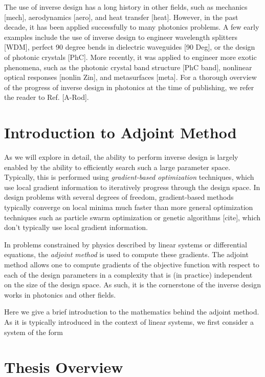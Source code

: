 The use of inverse design has a long history in other fields, such as mechanics [mech], aerodynamics [aero], and heat transfer [heat].
However, in the past decade, it has been applied successfully to many photonics problems.
A few early examples include the use of inverse design to engineer wavelength splitters [WDM], perfect 90 degree bends in dielectric waveguides [90 Deg], or the design of photonic crystals [PhC].
More recently, it was applied to engineer more exotic phenomena, such as the photonic crystal band structure [PhC band], nonlinear optical responses [nonlin Zin], and metasurfaces [meta].
For a thorough overview of the progress of inverse design in photonics at the time of publishing, we refer the reader to Ref. [A-Rod].

\section{Introduction to Adjoint Method}

As we will explore in detail, the ability to perform inverse design is largely enabled by the ability to efficiently search such a large parameter space.
Typically, this is performed using \textit{gradient-based optimization} techniques, which use local gradient information to iteratively progress through the design space.
In design problems with several degrees of freedom, gradient-based methods typically converge on local minima much faster than more general optimization techniques such as particle swarm optimization or genetic algorithms [cite], which don't typically use local gradient information.

In problems constrained by physics described by linear systems or differential equations, the \textit{adjoint method} is used to compute these gradients.
The adjoint method allows one to compute gradients of the objective function with respect to each of the design parameters in a complexity that is (in practice) independent on the size of the design space.
As such, it is the cornerstone of the inverse design works in photonics and other fields.

Here we give a brief introduction to the mathematics behind the adjoint method.
As it is typically introduced in the context of linear systems, we first consider a system of the form


\section{Thesis Overview}

